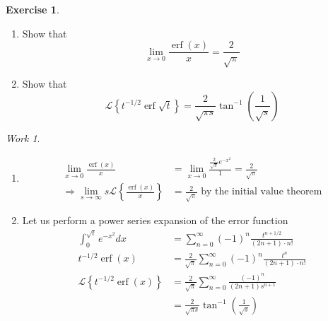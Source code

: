 \documentclass{report}
\theoremstyle{definition}
\newtheorem{exercise}{Exercise}[chapter]
\theoremstyle{remark}
\newtheorem*{work}{Work}
\newcommand{\lapt}[1]{\mathscr{L}\left\{ #1\right\}}
\begin{document}
\begin{exercise}
\leavevmode
    \begin{enumerate}[label=(\alph*)]
        \item Show that 
        \begin{equation*}
            \lim_{x\rightarrow 0} \frac{\operatorname{erf}(x)}{x} = \frac{2}{\sqrt \pi}
        \end{equation*}
        \item Show that 
        \begin{equation*}
            \lapt{t^{-1/2}\operatorname{erf}\sqrt t} = \frac{2}{\sqrt{\pi s}} \tan^{-1}\left( \frac{1}{\sqrt s}\right)
        \end{equation*}
    \end{enumerate}
\end{exercise}
\begin{work}
    \leavevmode
    \begin{enumerate}[label=(\alph*)]
        \item 
        \begin{equation*}
            \begin{split}
                \lim_{x\rightarrow 0} \frac{\operatorname{erf}(x)}{x} &= \lim_{x\rightarrow 0} \frac{\frac{2}{\sqrt \pi}e^{-x^2}}{1} = \frac{2}{\sqrt \pi} \\
                \Rightarrow \lim_{s\rightarrow \infty}s\lapt{\frac{\operatorname{erf}(x)}{x}} &= \frac{2}{\sqrt{\pi}} \text{ by the initial value theorem}
            \end{split}
        \end{equation*}
        \item Let us perform a power series expansion of the error function 
        \begin{equation*}
            \begin{split}
                \int^{\sqrt{t}}_0e^{-x^2}dx &= \sum^\infty_{n=0} (-1)^{n}\frac{t^{n+1/2}}{(2n+1)\cdot n!} \\
                t^{-1/2}\operatorname{erf}(x)&=\frac{2}{\sqrt \pi} \sum^\infty_{n=0}(-1)^n\frac{t^n}{(2n+1)\cdot n!} \\
                \lapt{t^{-1/2}\operatorname{erf}(x)} &= \frac{2}{\sqrt \pi} \sum^\infty_{n=0} \frac{(-1)^n}{(2n+1)s^{n+1}} \\
                &=\frac{2}{\sqrt{\pi s}}\tan^{-1}\left( \frac{1}{\sqrt s}\right)
            \end{split}
        \end{equation*}
    \end{enumerate}
\end{work}
\end{document}
